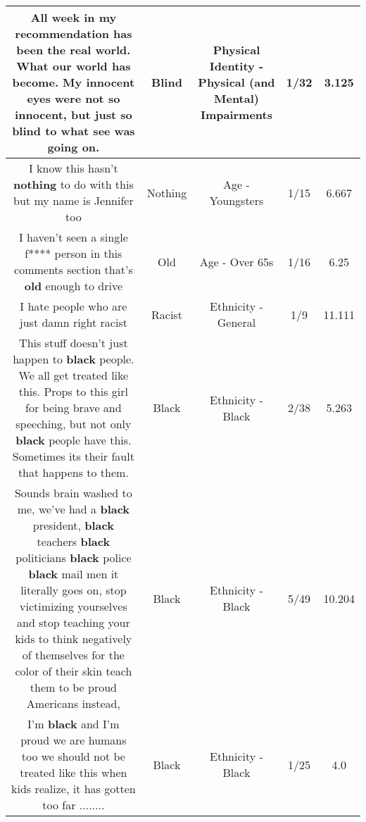 \documentclass[11pt]{article}
\newlength\mylength
\begin{document}
\begin{center}
\begin{longtable}{|C{.65\mylength}|C{.30\mylength}|C{.12\mylength}|C{.12\mylength}|C{.12\mylength}|}
  \small All week in my recommendation has been the real world. What our world has become. My innocent eyes were not so innocent, but just so \textbf{blind} to what see was going on.\normalsize   & Blind & Physical Identity - Physical (and Mental) Impairments & 1/32 & 3.125 \\  \hline
  \small I know this hasn't \textbf{nothing} to do with this but my name is Jennifer too\normalsize   & Nothing & Age - Youngsters & 1/15 & 6.667 \\  \hline
  \small I haven't seen a single f**** person in this comments section that's \textbf{old} enough to drive\normalsize   & Old & Age - Over 65s & 1/16 & 6.25 \\  \hline
  \small I hate people who are just damn right racist\normalsize   & Racist & Ethnicity - General & 1/9 & 11.111 \\  \hline
  \small This stuff doesn't just happen to \textbf{black} people. We all get treated like this. Props to this girl for being brave and speeching, but not only \textbf{black} people have this. Sometimes its their fault that happens to them.\normalsize   & Black & Ethnicity - Black & 2/38 & 5.263 \\  \hline
  \small Sounds brain washed to me, we've had a \textbf{black} president, \textbf{black} teachers \textbf{black} politicians \textbf{black} police \textbf{black} mail men it literally goes on, stop victimizing yourselves and stop teaching your kids to think negatively of themselves for the color of their skin teach them to be proud Americans instead,\normalsize   & Black & Ethnicity - Black & 5/49 & 10.204 \\  \hline
  \small I'm \textbf{black} and I'm proud we are humans too we should not be treated like this when kids realize, it has gotten too far ........\normalsize   & Black & Ethnicity - Black & 1/25 & 4.0 \\  \hline

\end{longtable}
\end{center}
\end{document}
